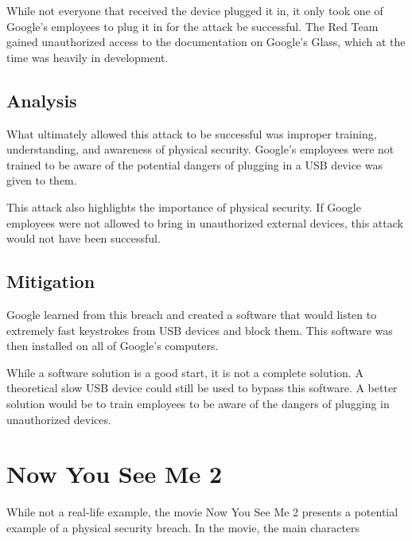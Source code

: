 \documentclass[acmlarge]{acmart}
\begin{document}
While not everyone that received the device plugged it in, it only took one of
Google's employees to plug it in for the attack be successful. The Red Team
gained unauthorized access to the documentation on Google's Glass, which
at the time was heavily in development.

\subsection{Analysis}
What ultimately allowed this attack to be successful was improper training, understanding,
and awareness of physical security. Google's employees were not trained to be aware
of the potential dangers of plugging in a USB device was given to them.

This attack also highlights the importance of physical security. If Google employees
were not allowed to bring in unauthorized external devices, this attack would not
have been successful.

\subsection{Mitigation}
Google learned from this breach and created a software that would listen to extremely
fast keystrokes from USB devices and block them. This software was then installed
on all of Google's computers.

While a software solution is a good start, it is not a complete solution. A theoretical
slow USB device could still be used to bypass this software. A better solution would
be to train employees to be aware of the dangers of plugging in unauthorized devices.

\section{Now You See Me 2}
While not a real-life example, the movie Now You See Me 2 \cite{NowYouSeeMe2} presents
a potential example of a physical security breach. In the movie, the main characters

% 
% 

\end{document}
